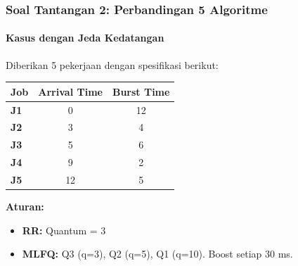 \documentclass[t,aspectratio=169,xcolor=dvipsnames]{beamer}
\begin{document}
\begin{frame}
    \frametitle{Soal Tantangan 2: Perbandingan 5 Algoritme}
    \framesubtitle{Kasus dengan Jeda Kedatangan}
    \small
    Diberikan 5 pekerjaan dengan spesifikasi berikut:
    \begin{table}[]
        \centering
        \begin{tabular}{lcc}
            \toprule
            \textbf{Job} & \textbf{Arrival Time} & \textbf{Burst Time} \\
            \midrule
            \textbf{J1} & 0 & 12 \\
            \textbf{J2} & 3 & 4 \\
            \textbf{J3} & 5 & 6 \\
            \textbf{J4} & 9 & 2 \\
            \textbf{J5} & 12 & 5 \\
            \bottomrule
        \end{tabular}
    \end{table}
    \vspace{0.2cm}
    \textbf{Aturan:}
    \begin{itemize}
        \item \textbf{RR:} Quantum = 3
        \item \textbf{MLFQ:} Q3 (q=3), Q2 (q=5), Q1 (q=10). Boost setiap 30 ms.
    \end{itemize}
\end{frame}
\end{document}

